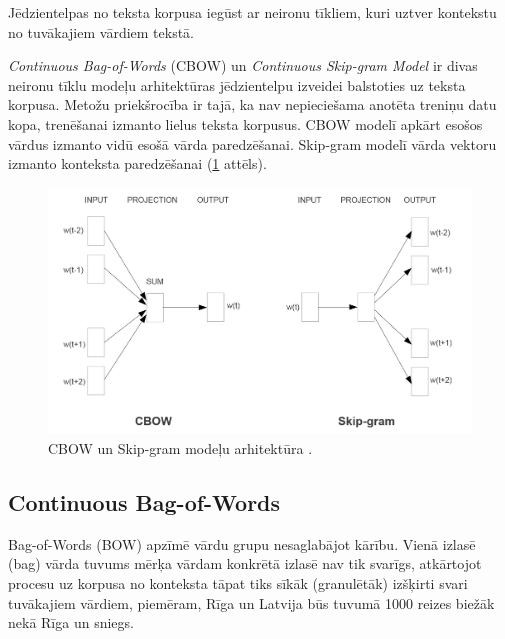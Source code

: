 Jēdzientelpas no teksta korpusa iegūst ar neironu tīkliem, kuri uztver kontekstu no tuvākajiem vārdiem tekstā.

\textit{Continuous Bag-of-Words} (CBOW) un \textit{Continuous Skip-gram Model} ir divas neironu tīklu modeļu arhitektūras jēdzientelpu izveidei balstoties uz teksta korpusa. Metožu priekšrocība ir tajā, ka nav nepieciešama anotēta treniņu datu kopa, trenēšanai izmanto lielus teksta korpusus. CBOW modelī apkārt esošos vārdus izmanto vidū esošā vārda paredzēšanai. Skip-gram modelī vārda vektoru izmanto konteksta paredzēšanai (\ref{fig:cbow-skipgram} attēls).

\begin{figure}[h]
	\centering
	\includegraphics[width=\textwidth]{figures/word2vec-models.png}
	\caption{CBOW un Skip-gram modeļu arhitektūra \cite{word2vec2013}.}
	\label{fig:cbow-skipgram}
\end{figure}







\subsection{Continuous Bag-of-Words}

Bag-of-Words (BOW) apzīmē vārdu grupu nesaglabājot kārību. Vienā izlasē (bag) vārda tuvums mērķa vārdam konkrētā izlasē nav tik svarīgs, atkārtojot procesu uz korpusa no konteksta tāpat tiks sīkāk (granulētāk) izšķirti svari tuvākajiem vārdiem, piemēram, Rīga un Latvija būs tuvumā 1000 reizes biežāk nekā Rīga un sniegs.


